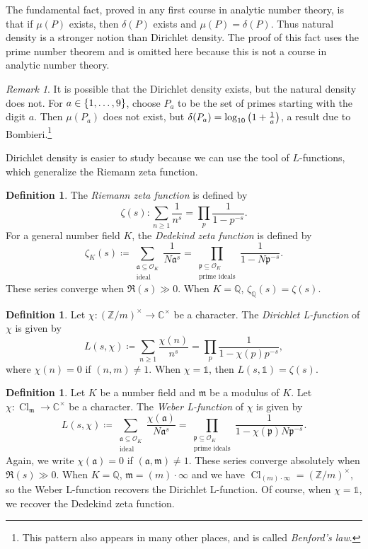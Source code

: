 \documentclass[leqno, openany]{memoir}
\theoremstyle{definition}
\newtheorem{defn}[thm]{Definition}
\theoremstyle{remark}
\newtheorem{rmk}[thm]{Remark}
\theoremstyle{plain}
\theoremstyle{definition}
\theoremstyle{remark}
\newcommand{\C}{\mathbb{C}}
\newcommand{\Z}{\mathbb{Z}}
\newcommand{\Q}{\mathbb{Q}}
\newcommand{\mc}[1]{\mathcal{#1}}
\newcommand{\mf}[1]{\mathfrak{#1}}
\DeclareMathOperator{\Cl}{Cl}
\begin{document}
The fundamental fact, proved in any first course in analytic number theory, is
that if $\mu(P)$ exists, then $\delta(P)$ exists and $\mu(P) = \delta(P)$. Thus
natural density is a stronger notion than Dirichlet density. The proof of this
fact uses the prime number theorem and is omitted here because this is not a
course in analytic number theory.

\begin{rmk} It is possible that the Dirichlet density exists, but the natural
    density does not. For $a \in \qty{1, \ldots, 9}$, choose $P_a$ to be the
    set of primes starting with the digit $a$. Then $\mu(P_a)$ does not exist,
    but $\delta(P_a) = \log_{10}\qty(1 + \frac{1}{a})$, a result due to
    Bombieri.\footnote{This pattern also appears in many other places, and is
    called \textit{Benford's law}.} \end{rmk}

Dirichlet density is easier to study because we can use the tool of
$L$-functions, which generalize the Riemann zeta function.

\begin{defn} The \textit{Riemann zeta function} is defined by \[ \zeta(s)
    \colon \sum_{n \geq 1} \frac{1}{n^s} = \prod_p \frac{1}{1-p^{-s}}. \] For a
    general number field $K$, the \textit{Dedekind zeta function} is defined by
    \[ \zeta_K(s) \coloneqq \sum_{\substack{\mf{a} \subseteq \mc{O}_K \\
    \text{ideal}}} \frac{1}{N\mf{a}^s} = \prod_{\substack{\mf{p} \subseteq
    \mc{O}_K \\ \text{prime ideals}}} \frac{1}{1-N\mf{p}^{-s}}. \] These series
converge when $\Re (s) \gg 0$. When $K = \Q$, $\zeta_{\Q}(s) = \zeta(s)$.
\end{defn}

\begin{defn} Let $\chi \colon {(\Z/m)}^{\times} \to \C^{\times}$ be a
    character. The \textit{Dirichlet L-function} of $\chi$ is given by \[ L(s,
    \chi) \coloneqq \sum_{n \geq 1} \frac{\chi(n)}{n^s} = \prod_p \frac{1}{1-
\chi(p) p^{-s}}, \] where $\chi(n) = 0$ if $(n,m) \neq 1$. When $\chi =
\mathbb{1}$, then $L(s, \mathbb{1}) = \zeta(s)$.  \end{defn}

\begin{defn} Let $K$ be a number field and $\mf{m}$ be a modulus of $K$. Let
    $\chi \colon \Cl_{\mf{m}} \to \C^{\times}$ be a character. The
    \textit{Weber L-function} of $\chi$ is given by \[ L(s, \chi) \coloneqq
    \sum_{\substack{\mf{a} \subseteq \mc{O}_K \\ \text{ideal}}}
\frac{\chi(\mf{a})}{N\mf{a}^s} = \prod_{\substack{\mf{p} \subseteq \mc{O}_K \\
\text{prime ideals}}} \frac{1}{1-\chi(\mf{p})N\mf{p}^{-s}}. \] Again, we write
$\chi(\mf{a}) = 0$ if $(\mf{a}, \mf{m}) \neq 1$. These series converge
absolutely when $\Re(s) \gg 0$. When $K = \Q$, $\mf{m} = (m) \cdot \infty$ and
we have $\Cl_{(m) \cdot \infty} = {(\Z/m)}^{\times}$, so the Weber L-function
recovers the Dirichlet L-function. Of course, when $\chi = \mathbb{1}$, we
recover the Dedekind zeta function.  \end{defn}
\end{document}
